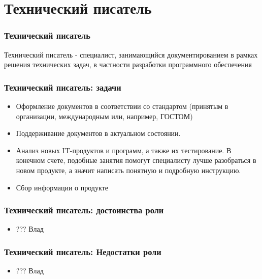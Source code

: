 \documentclass{../industrial-development}
\begin{document}
	
	\section{Технический писатель }
	
	\begin{frame} \frametitle{Технический писатель}
		\begin{block}{}
			\alert {Технический писатель} - специалист, занимающийся документированием в рамках решения технических задач, в частности разработки программного обеспечения
		\end{block}
	\end{frame}

	\begin{frame} \frametitle{Технический писатель: задачи}
		\begin{block}{}
			\begin{itemize}
				\item Оформление документов в соответствии со стандартом (принятым в организации, международным или, например, ГОСТОМ)
				\item Поддерживание документов в актуальном состоянии.
				\item Анализ новых IT-продуктов и программ, а также их тестирование. В конечном счете, подобные занятия помогут специалисту лучше разобраться в новом продукте, а значит написать понятную и подробную инструкцию.
				\item  Сбор информации о продукте
			\end{itemize}
		\end{block}
	\end{frame}

	\begin{frame} \frametitle{Технический писатель:  достоинства роли}
		\begin{block}{}
			\begin{itemize}
				\item ??? Влад
			\end{itemize}
		\end{block}
	\end{frame}

	\begin{frame} \frametitle{Технический писатель: Недостатки роли}
		\begin{block}{}
			\begin{itemize}
				\item ??? Влад
			\end{itemize}
		\end{block}
	\end{frame}
	
\end{document}
